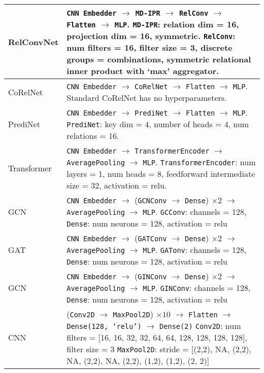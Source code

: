 \begin{tabular}{p{}p{}}
    RelConvNet        & 
        \texttt{CNN Embedder} $\to$ \texttt{MD-IPR} $\to$ \texttt{RelConv} $\to$ \texttt{Flatten} $\to$ \texttt{MLP}. \newline
        \texttt{MD-IPR}: relation dim = 16, projection dim = 16, symmetric. \newline
        \texttt{RelConv}: num filters = 16, filter size = 3, discrete groups = combinations, symmetric relational inner product with `max' aggregator. \\\hline
    CoRelNet          &
        \texttt{CNN Embedder} $\to$ \texttt{CoRelNet} $\to$ \texttt{Flatten} $\to$ \texttt{MLP}. \newline
        Standard CoRelNet has no hyperparameters. \\\hline
    PrediNet          &
        \texttt{CNN Embedder} $\to$ \texttt{PrediNet} $\to$ \texttt{Flatten} $\to$ \texttt{MLP}. \newline
        \texttt{PrediNet}: key dim = 4, number of heads = 4, num relations = 16. \\\hline
    Transformer       & 
        \texttt{CNN Embedder} $\to$ \texttt{TransformerEncoder} $\to$ \texttt{AveragePooling} $\to$ \texttt{MLP}. \newline
        \texttt{TransformerEncoder}: num layers = 1, num heads = 8, feedforward intermediate size = 32, activation = relu. \\\hline
    GCN               &
        \texttt{CNN Embedder} $\to$ (\texttt{GCNConv} $\to$ \texttt{Dense}) $\times 2$ $\to$ \texttt{AveragePooling} $\to$ \texttt{MLP}. \newline
        \texttt{GCConv}: channels = 128, \texttt{Dense}: num neurons = 128, activation = relu \\\hline
    GAT               &
        \texttt{CNN Embedder} $\to$ (\texttt{GATConv} $\to$ \texttt{Dense}) $\times 2$ $\to$ \texttt{AveragePooling} $\to$ \texttt{MLP}. \newline
        \texttt{GATonv}: channels = 128, \texttt{Dense}: num neurons = 128, activation = relu \\\hline
    GCN               &
        \texttt{CNN Embedder} $\to$ (\texttt{GINConv} $\to$ \texttt{Dense}) $\times 2$ $\to$ \texttt{AveragePooling} $\to$ \texttt{MLP}. \newline
        \texttt{GINConv}: channels = 128, \texttt{Dense}: num neurons = 128, activation = relu \\\hline
    CNN               &
        (\texttt{Conv2D} $\to$ \texttt{MaxPool2D}) $\times 10$ $\to$ \texttt{Flatten} $\to$ \texttt{Dense(128, `relu')} $\to$ \texttt{Dense(2)} \newline
        \texttt{Conv2D}: num filters = [16, 16, 32, 32, 64, 64, 128, 128, 128, 128], filter size = $3$ \newline
        \texttt{MaxPool2D}: stride = [(2,2), NA, (2,2), NA, (2,2), NA, (2,2), (1,2), (1,2), (2, 2)] \\ \bottomrule
\end{tabular}

